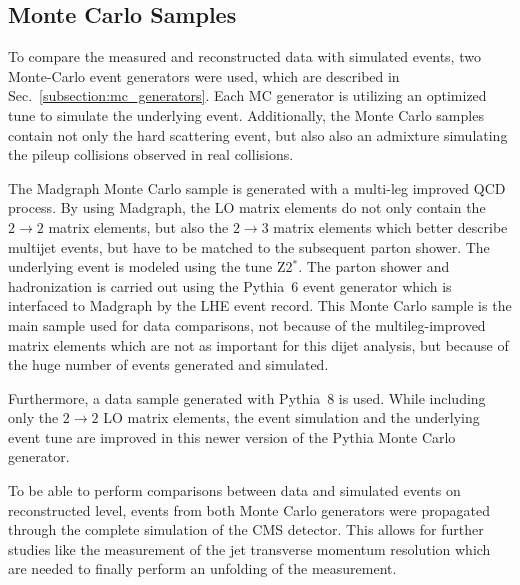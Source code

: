 \subsection{Monte Carlo Samples}

To compare the measured and reconstructed data with simulated events, two
Monte-Carlo event generators were used, which are described in
Sec.~\ref{subsection:mc_generators}. Each MC generator is utilizing an optimized
tune to simulate the underlying event. Additionally, the Monte Carlo samples
contain not only the hard scattering event, but also also an admixture
simulating the pileup collisions observed in real collisions.

The Madgraph Monte Carlo sample is generated with a multi-leg improved QCD
process. By using Madgraph, the LO matrix elements do not only contain the $2
\rightarrow 2$ matrix elements, but also the $2 \rightarrow 3$ matrix elements
which better describe multijet events, but have to be matched to the subsequent
parton shower. The underlying event is modeled using the tune Z2$^*$. The parton
shower and hadronization is carried out using the Pythia~6 event generator which
is interfaced to Madgraph by the LHE event record. This Monte Carlo sample is
the main sample used for data comparisons, not because of the multileg-improved
matrix elements which are not as important for this dijet analysis, but because
of the huge number of events generated and simulated.

Furthermore, a data sample generated with Pythia~8 is used. While including only the $2
\rightarrow 2$ LO matrix elements, the event simulation and the underlying event
tune are improved in this newer version of the Pythia Monte Carlo generator.

To be able to perform comparisons between data and simulated events on
reconstructed level, events from both Monte Carlo generators were propagated
through the complete simulation of the CMS detector. This allows for further
studies like the measurement of the jet transverse momentum resolution which are
needed to finally perform an unfolding of the measurement.


